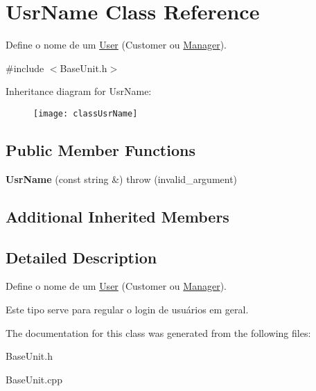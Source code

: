 \hypertarget{classUsrName}{\section{Usr\-Name Class Reference}
\label{classUsrName}
}


Define o nome de um \hyperlink{classUser}{User} (Customer ou \hyperlink{classManager}{Manager}).  




{\ttfamily \#include $<$Base\-Unit.\-h$>$}

Inheritance diagram for Usr\-Name\-:\begin{figure}[H]
\begin{center}
\leavevmode
\texttt{[image: classUsrName]}
\end{center}
\end{figure}
\subsection*{Public Member Functions}
\begin{DoxyCompactItemize}
\item 
\hypertarget{classUsrName_a3028672b21248ef880a01e3621e02827}{{\bfseries Usr\-Name} (const string \&)  throw (invalid\-\_\-argument)}\label{classUsrName_a3028672b21248ef880a01e3621e02827}

\end{DoxyCompactItemize}
\subsection*{Additional Inherited Members}


\subsection{Detailed Description}
Define o nome de um \hyperlink{classUser}{User} (Customer ou \hyperlink{classManager}{Manager}). 

Este tipo serve para regular o login de usuários em geral. 

The documentation for this class was generated from the following files\-:\begin{DoxyCompactItemize}
\item 
Base\-Unit.\-h\item 
Base\-Unit.\-cpp\end{DoxyCompactItemize}
